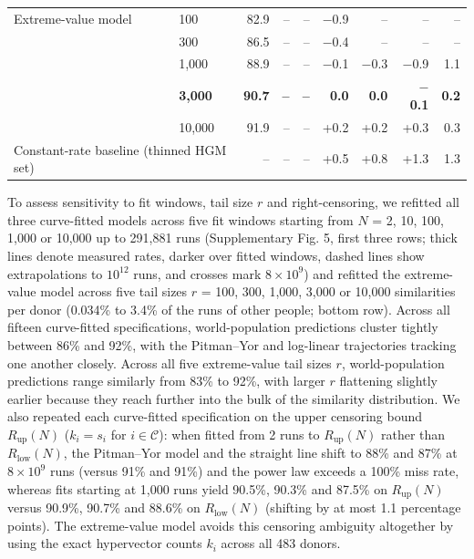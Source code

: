 \documentclass[11pt,a4paper]{article}
\begin{document}
\begin{table}[!htbp]
\begin{tabular}{llrrrrrrr}
Extreme-value model & 100 & 82.9 & -- & -- & $-$0.9 & -- & -- & -- \\
 & 300 & 86.5 & -- & -- & $-$0.4 & -- & -- & -- \\
 & 1,000 & 88.9 & -- & -- & $-$0.1 & $-$0.3 & $-$0.9 & 1.1 \\
 & \textbf{3,000} & \textbf{90.7} & \textbf{--} & \textbf{--} & \textbf{0.0} & \textbf{0.0} & \textbf{$-$0.1} & \textbf{0.2} \\
 & 10,000 & 91.9 & -- & -- & +0.2 & +0.2 & +0.3 & 0.3 \\
\midrule
\multicolumn{2}{l}{Constant-rate baseline (thinned HGM set)} & -- & -- & -- & +0.5 & +0.8 & +1.3 & 1.3 \\
\bottomrule
\end{tabular}
\end{table}

To assess sensitivity to fit windows, tail size $r$ and right-censoring, we refitted all three curve-fitted models across five fit windows starting from $N$ = 2, 10, 100, 1,000 or 10,000 up to 291,881 runs (Supplementary Fig. 5, first three rows; thick lines denote measured rates, darker over fitted windows, dashed lines show extrapolations to $10^{12}$ runs, and crosses mark $8\times10^9$) and refitted the extreme-value model across five tail sizes $r$ = 100, 300, 1,000, 3,000 or 10,000 similarities per donor (0.034\% to 3.4\% of the runs of other people; bottom row). Across all fifteen curve-fitted specifications, world-population predictions cluster tightly between 86\% and 92\%, with the Pitman--Yor and log-linear trajectories tracking one another closely. Across all five extreme-value tail sizes $r$, world-population predictions range similarly from 83\% to 92\%, with larger $r$ flattening slightly earlier because they reach further into the bulk of the similarity distribution. We also repeated each curve-fitted specification on the upper censoring bound $R_{\mathrm{up}}(N)$ ($k_i = s_i$ for $i \in \mathcal{C}$): when fitted from 2 runs to $R_{\mathrm{up}}(N)$ rather than $R_{\mathrm{low}}(N)$, the Pitman--Yor model and the straight line shift to 88\% and 87\% at $8\times10^9$ runs (versus 91\% and 91\%) and the power law exceeds a 100\% miss rate, whereas fits starting at 1,000 runs yield 90.5\%, 90.3\% and 87.5\% on $R_{\mathrm{up}}(N)$ versus 90.9\%, 90.7\% and 88.6\% on $R_{\mathrm{low}}(N)$ (shifting by at most 1.1 percentage points). The extreme-value model avoids this censoring ambiguity altogether by using the exact hypervector counts $k_i$ across all 483 donors.
\end{document}
